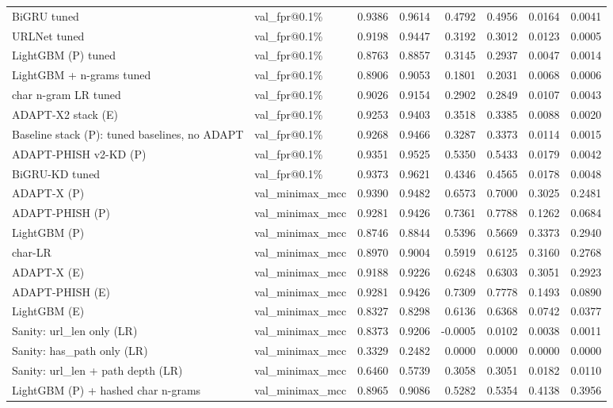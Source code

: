 \begin{table}[t]
\begin{tabular}{llrrrrrr}
BiGRU tuned & val\_fpr@0.1\% & 0.9386 & 0.9614 & 0.4792 & 0.4956 & 0.0164 & 0.0041 \\
URLNet tuned & val\_fpr@0.1\% & 0.9198 & 0.9447 & 0.3192 & 0.3012 & 0.0123 & 0.0005 \\
LightGBM (P) tuned & val\_fpr@0.1\% & 0.8763 & 0.8857 & 0.3145 & 0.2937 & 0.0047 & 0.0014 \\
LightGBM + n-grams tuned & val\_fpr@0.1\% & 0.8906 & 0.9053 & 0.1801 & 0.2031 & 0.0068 & 0.0006 \\
char n-gram LR tuned & val\_fpr@0.1\% & 0.9026 & 0.9154 & 0.2902 & 0.2849 & 0.0107 & 0.0043 \\
ADAPT-X2 stack (E) & val\_fpr@0.1\% & 0.9253 & 0.9403 & 0.3518 & 0.3385 & 0.0088 & 0.0020 \\
Baseline stack (P): tuned baselines, no ADAPT & val\_fpr@0.1\% & 0.9268 & 0.9466 & 0.3287 & 0.3373 & 0.0114 & 0.0015 \\
ADAPT-PHISH v2-KD (P) & val\_fpr@0.1\% & 0.9351 & 0.9525 & 0.5350 & 0.5433 & 0.0179 & 0.0042 \\
BiGRU-KD tuned & val\_fpr@0.1\% & 0.9373 & 0.9621 & 0.4346 & 0.4565 & 0.0178 & 0.0048 \\
ADAPT-X (P) & val\_minimax\_mcc & 0.9390 & 0.9482 & 0.6573 & 0.7000 & 0.3025 & 0.2481 \\
ADAPT-PHISH (P) & val\_minimax\_mcc & 0.9281 & 0.9426 & 0.7361 & 0.7788 & 0.1262 & 0.0684 \\
LightGBM (P) & val\_minimax\_mcc & 0.8746 & 0.8844 & 0.5396 & 0.5669 & 0.3373 & 0.2940 \\
char-LR & val\_minimax\_mcc & 0.8970 & 0.9004 & 0.5919 & 0.6125 & 0.3160 & 0.2768 \\
ADAPT-X (E) & val\_minimax\_mcc & 0.9188 & 0.9226 & 0.6248 & 0.6303 & 0.3051 & 0.2923 \\
ADAPT-PHISH (E) & val\_minimax\_mcc & 0.9281 & 0.9426 & 0.7309 & 0.7778 & 0.1493 & 0.0890 \\
LightGBM (E) & val\_minimax\_mcc & 0.8327 & 0.8298 & 0.6136 & 0.6368 & 0.0742 & 0.0377 \\
Sanity: url\_len only (LR) & val\_minimax\_mcc & 0.8373 & 0.9206 & -0.0005 & 0.0102 & 0.0038 & 0.0011 \\
Sanity: has\_path only (LR) & val\_minimax\_mcc & 0.3329 & 0.2482 & 0.0000 & 0.0000 & 0.0000 & 0.0000 \\
Sanity: url\_len + path depth (LR) & val\_minimax\_mcc & 0.6460 & 0.5739 & 0.3058 & 0.3051 & 0.0182 & 0.0110 \\
LightGBM (P) + hashed char n-grams & val\_minimax\_mcc & 0.8965 & 0.9086 & 0.5282 & 0.5354 & 0.4138 & 0.3956 \\

\end{tabular}
\end{table}
